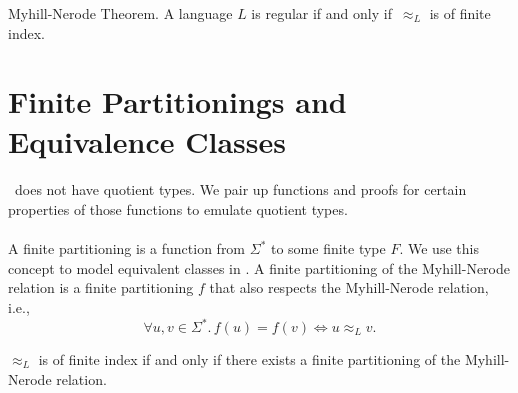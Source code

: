 \documentclass[11pt,a4paper,oneside]{book}
\begin{document}

            \begin{theorem}{Myhill-Nerode Theorem.}
                \label{MN}
                A language $L$ is regular if and only if $\,\approx_L$ is of finite index.
            \end{theorem}

        \section{Finite Partitionings and Equivalence Classes}

            \paragraph{}
                \coq\ does not have quotient types. 
                We pair up functions and proofs for certain properties of those functions to emulate quotient types.

            \paragraph{} 
                A finite partitioning is a function from $\Sigma^*$ to some finite type $F$. 
                We use this concept to model equivalent classes in \coq. 
                A finite partitioning of the Myhill-Nerode relation is a finite partitioning $f$ that also respects the Myhill-Nerode relation, i.e.,
                \[
                    \forall u, v \in \Sigma^*. \,
                    f(u) = f(v) \Leftrightarrow u \approx_L v.
                \]
                


                \begin{theorem}
                    $\approx_L$ is of finite index if and only if there exists a finite partitioning of the Myhill-Nerode relation.
                \end{theorem}
\end{document}
